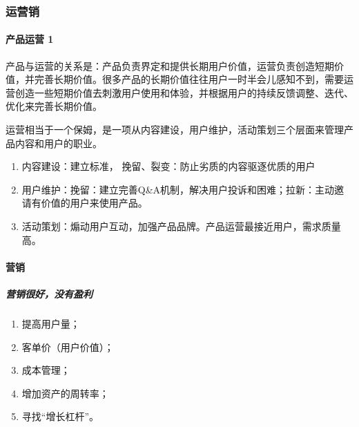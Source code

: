 \documentclass[letterpaper,11pt,english]{sphinxmanual}
\begin{document}
\subsubsection{运营销}
\label{\detokenize{chapter_idea/yunyingxiao:id1}}\label{\detokenize{chapter_idea/yunyingxiao::doc}}

\paragraph{产品运营 1\sphinxfootnotemark[137]}
\label{\detokenize{chapter_idea/yunyingxiao:id2}}%
\begin{footnotetext}[137]\sphinxAtStartFootnote
{}
%
\end{footnotetext}\ignorespaces 
产品与运营的关系是：产品负责界定和提供长期用户价值，运营负责创造短期价值，并完善长期价值。很多产品的长期价值往往用户一时半会儿感知不到，需要运营创造一些短期价值去刺激用户使用和体验，并根据用户的持续反馈调整、迭代、优化来完善长期价值。

运营相当于一个保姆，是一项从内容建设，用户维护，活动策划三个层面来管理产品内容和用户的职业。
\begin{enumerate}
%
\item {} 
内容建设：建立标准， 挽留、裂变：防止劣质的内容驱逐优质的用户

\item {} 
用户维护：挽留：建立完善Q\&A机制，解决用户投诉和困难；拉新：主动邀请有价值的用户来使用产品。

\item {} 
活动策划：煽动用户互动，加强产品品牌。产品运营最接近用户，需求质量高。

\end{enumerate}


\paragraph{营销}
\label{\detokenize{chapter_idea/yunyingxiao:id3}}

\subparagraph{营销很好，没有盈利}
\label{\detokenize{chapter_idea/yunyingxiao:id4}}\begin{enumerate}
%
\item {} 
提高用户量；

\item {} 
客单价（用户价值）；

\item {} 
成本管理；

\item {} 
增加资产的周转率；

\item {} 
寻找“增长杠杆”。

\end{enumerate}
\end{document}
